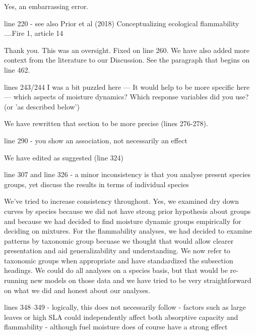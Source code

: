 \documentclass[letterpaper, 12pt]{letter}
\begin{document}
\begin{letter}{}
Yes, an embarrassing error.

\begin{quoting}
  line 220 - see also Prior et al (2018) Conceptualizing ecological
  flammability ....Fire 1, article 14
\end{quoting}

Thank you. This was an oversight. Fixed on line 260. We have also added more
context from the literature to our Discussion. See the paragraph that begins on
line 462.


\begin{quoting}
  lines 243/244 I was a bit puzzled here --- It would help to be more specific
  here --- which aspects of moisture dynamics? Which response variables did you
  use? (or 'as described below')
\end{quoting}

We have rewritten that section to be more precise (lines 276-278). 

\begin{quoting}
line 290 - you show an association, not necessarily an effect
\end{quoting}

We have edited as suggested (line 324)

\begin{quoting}
  line 307 and line 326 - a minor inconsistency is that you analyse present
  species groups, yet discuss the results in terms of individual species
\end{quoting}

We've tried to increase consistency throughout. Yes, we examined dry down
curves by species because we did not have strong prior hypothesis about
groups and because we had decided to find moisture dynamic groups empirically
for deciding on mixtures. For the flammability analyses, we had decided to
examine patterns by taxonomic group becuase we thought that would allow clearer
presentation and aid generalizability and understanding. We now refer to
taxonomic groups when appropriate and have standardized the subsection
headings. We could do all analyses on a species basis, but that would be
re-running new models on those data and we have tried to be very
straightforward on what we did and honest about our analyses.

\begin{quoting}
  lines 348--349 - logically, this does not necessarily follow - factors such as
  large leaves or high SLA could independently affect both absorptive capacity
  and flammability - although fuel moisture does of course have a strong effect
\end{quoting}


\end{letter}
\end{document}
